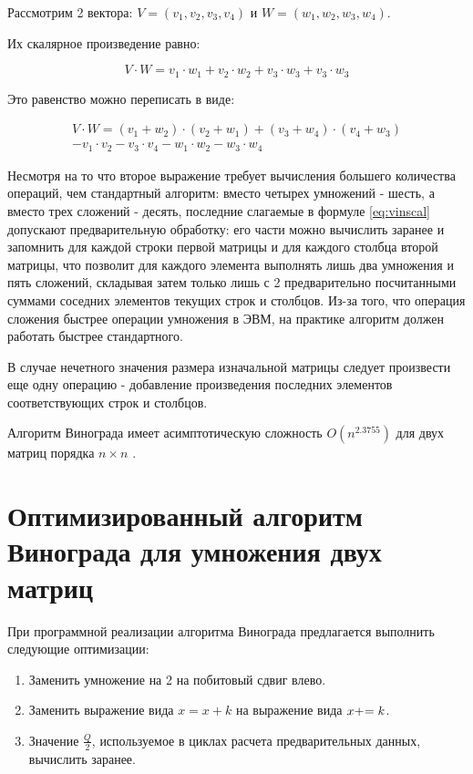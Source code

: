 Рассмотрим 2 вектора: $V = (v_1, v_2, v_3, v_4)$ и $W = (w_1, w_2, w_3, w_4)$.

\clearpage

Их скалярное произведение равно:

\begin{equation}
	\label{eq:vimul}
	V \cdot W = v_1 \cdot w_1 + v_2 \cdot w_2 + v_3 \cdot w_3 + v_3 \cdot w_3
\end{equation}

Это равенство можно переписать в виде:

\begin{equation}
	\label{eq:vinscal}
	\begin{gathered} 
		V \cdot W = (v_1 + w_2) \cdot (v_2 + w_1) + (v_3 + w_4) \cdot (v_4 + w_3) \\
		- v_1 \cdot v_2 - v_3 \cdot v_4 - w_1 \cdot w_2 - w_3 \cdot w_4
	\end{gathered}
\end{equation}


Несмотря на то что второе выражение требует вычисления большего количества операций, чем стандартный алгоритм: вместо четырех умножений - шесть, а вместо трех сложений - десять, последние слагаемые в формуле \ref{eq:vinscal} допускают предварительную обработку: его части можно вычислить заранее и запомнить для каждой строки первой матрицы и для каждого столбца второй матрицы, что позволит для каждого элемента выполнять лишь два умножения и пять сложений, складывая затем только лишь с 2 предварительно посчитанными суммами соседних элементов текущих строк и столбцов. Из-за того, что операция сложения быстрее операции умножения в ЭВМ, на практике алгоритм должен работать быстрее стандартного.

В случае нечетного значения размера изначальной матрицы следует произвести еще одну операцию - добавление произведения последних элементов соответствующих строк и столбцов.

Алгоритм Винограда имеет асимптотическую сложность $O(n^{2.3755})$ для двух матриц порядка $n \times n$ \cite{Vin2}.

\section{Оптимизированный алгоритм Винограда для умножения двух матриц}

При программной реализации алгоритма Винограда предлагается выполнить следующие оптимизации: 

\begin{enumerate}[label={\arabic*)}]
	\item Заменить умножение на 2 на побитовый сдвиг влево.
	\item Заменить выражение вида $x = x + k$ на выражение вида $x +\kern-0.25em= k$.
	\item Значение $\frac{Q}{2}$, используемое в циклах расчета предварительных данных, вычислить заранее.
\end{enumerate}

